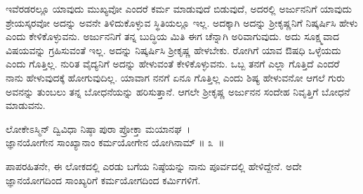 ಇವೆರಡರಲ್ಲೂ ಯಾವುದು ಮುಖ್ಯವೋ ಎಂದರೆ ಕರ್ಮ ಮಾಡುವುದೆ ಬಿಡುವುದೆ, ಅದರಲ್ಲಿ ಅರ್ಜುನನಿಗೆ ಯಾವುದು ಶ್ರೇಯಸ್ಕರವೋ ಅದನ್ನು ಅವನೇ ತಿಳಿದುಕೊಳ್ಳುವ ಸ್ಥಿತಿಯಲ್ಲೂ ಇಲ್ಲ. ಅದಕ್ಕಾಗಿ ಅದನ್ನು ಶ‍್ರೀಕೃಷ್ಣನಿಗೆ ನಿಷ್ಕರ್ಷಿಸಿ ಹೇಳು ಎಂದು ಕೇಳಿಕೊಳ್ಳುವನು. ಅರ್ಜುನನಿಗೆ ತನ್ನ ಬುದ್ಧಿಯ ಮಿತಿ ಈಗ ಚೆನ್ನಾಗಿ ಅರಿವಾಗುವುದು. ಅದು ಸೂಕ್ಷ್ಮವಾದ ವಿಷಯವನ್ನು ಗ್ರಹಿಸುವಂತೆ ಇಲ್ಲ. ಅದನ್ನು ನಿಷ್ಕರ್ಷಿಸಿ ಶ‍್ರೀಕೃಷ್ಣ ಹೇಳಬೇಕು. ರೋಗಿಗೆ ಯಾವ ಔಷಧಿ ಒಳ್ಳೆಯದು ಎಂದು ಗೊತ್ತಿಲ್ಲ. ನುರಿತ ವೈದ್ಯನಿಗೆ ಅದನ್ನು ಹೇಳುವಂತೆ ಕೇಳಿಕೊಳ್ಳುವನು. ಒಬ್ಬ ತನಗೆ ಎಲ್ಲಾ ಗೊತ್ತಿದೆ ಎಂದರೆ ನಾನು ಹೇಳುವುದಕ್ಕೆ ಹೋಗುವುದಿಲ್ಲ. ಯಾವಾಗ ನನಗೆ ಏನೂ ಗೊತ್ತಿಲ್ಲ ಎಂದು ಶಿಷ್ಯ ಹೇಳುವನೋ ಆಗಲೆ ಗುರು ಅವನನ್ನು ತುಂಬಲು ತನ್ನ ಬೋಧನೆಯನ್ನು ಹರಿಸುತ್ತಾನೆ. ಆಗಲೇ ಶ‍್ರೀಕೃಷ್ಣ ಅರ್ಜುನನ ಸಂದೇಹ ನಿವೃತ್ತಿಗೆ ಬೋಧನೆ ಮಾಡುವನು.

\begin{shloka}
ಲೋಕೇಽಸ್ಮಿನ್ ದ್ವಿವಿಧಾ ನಿಷ್ಠಾ ಪುರಾ ಪ್ರೋಕ್ತಾ ಮಯಾನಘ~।\\ಜ್ಞಾನಯೋಗೇನ ಸಾಂಖ್ಯಾನಾಂ ಕರ್ಮಯೋಗೇನ ಯೋಗಿನಾಮ್ \hfill॥ ೩~॥
\end{shloka}

\begin{artha}
ಪಾಪರಹಿತನೇ, ಈ ಲೋಕದಲ್ಲಿ ಎರಡು ಬಗೆಯ ನಿಷ್ಠೆಯನ್ನು ನಾನು ಪೂರ್ವದಲ್ಲಿ ಹೇಳಿದ್ದೇನೆ. ಅದೇ ಜ್ಞಾನಯೋಗದಿಂದ ಸಾಂಖ್ಯರಿಗೆ ಕರ್ಮಯೋಗದಿಂದ ಕರ್ಮಿಗಳಿಗೆ.
\end{artha}

